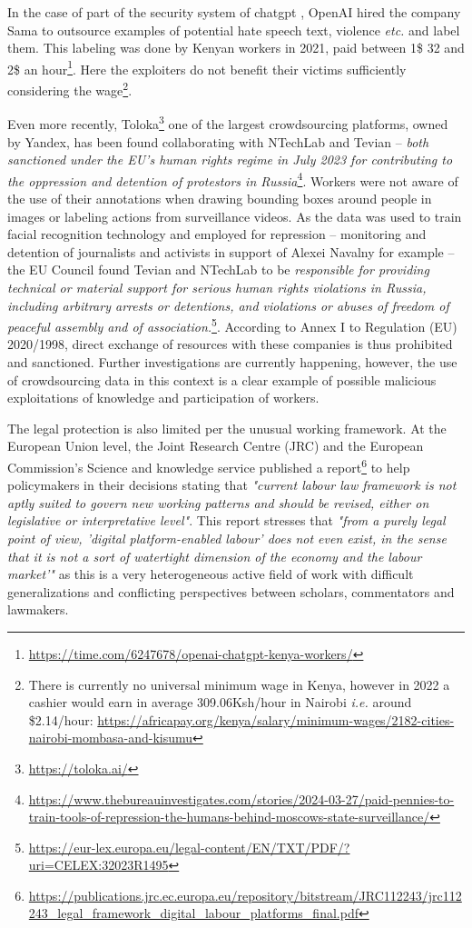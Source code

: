 In the case of part of the security system of chatgpt \citep{openai2023gpt4}, OpenAI hired the company Sama to outsource examples of potential hate speech text, violence \emph{etc.} and label them.
This labeling was done by Kenyan workers in 2021, paid between 1\$ 32 and 2\$ an hour\footnote{\url{https://time.com/6247678/openai-chatgpt-kenya-workers/}}. Here the exploiters do not benefit their victims sufficiently considering the wage\footnote{There is currently no universal minimum wage in Kenya, however in 2022 a cashier would earn in average 309.06Ksh/hour in Nairobi \emph{i.e.} around \$2.14/hour: \url{https://africapay.org/kenya/salary/minimum-wages/2182-cities-nairobi-mombasa-and-kisumu}}.

Even more recently, Toloka\footnote{\url{https://toloka.ai/}} one of the largest crowdsourcing platforms, owned by Yandex, has been found collaborating with NTechLab and Tevian -- \emph{both sanctioned under the EU's human rights regime in July 2023 for contributing to the oppression and detention of protestors in Russia}\footnote{\url{https://www.thebureauinvestigates.com/stories/2024-03-27/paid-pennies-to-train-tools-of-repression-the-humans-behind-moscows-state-surveillance/}}.
Workers were not aware of the use of their annotations when drawing bounding boxes around people in images or labeling actions from surveillance videos.
As the data was used to train facial recognition technology and employed for repression -- monitoring and detention of journalists and activists in support of Alexei Navalny for example -- the EU Council found Tevian and NTechLab to be \emph{responsible for providing technical or material support for serious human rights violations in Russia, including arbitrary arrests or detentions, and violations or abuses of freedom of peaceful assembly and of association.}\footnote{\url{https://eur-lex.europa.eu/legal-content/EN/TXT/PDF/?uri=CELEX:32023R1495}}. According to Annex I to Regulation (EU) 2020/1998, direct exchange of resources with these companies is thus prohibited and sanctioned. Further investigations are currently happening, however, the use of crowdsourcing data in this context is a clear example of possible malicious exploitations of knowledge and participation of workers.

The legal protection is also limited per the unusual working framework. At the European Union level, the Joint Research Centre (JRC) and the European Commission’s Science and knowledge service published a report\footnote{\url{https://publications.jrc.ec.europa.eu/repository/bitstream/JRC112243/jrc112243_legal_framework_digital_labour_platforms_final.pdf}} to help policymakers in their decisions stating that \emph{"current labour law framework is not aptly suited to govern new working patterns and should be revised, either on legislative or interpretative level"}.
This report stresses that \emph{"from a purely legal point of view, 'digital platform-enabled labour' does not even exist, in the sense that it is not a sort of watertight dimension of the economy and the labour market'"} as this is a very heterogeneous active field of work with difficult generalizations and conflicting perspectives between scholars, commentators and lawmakers.

